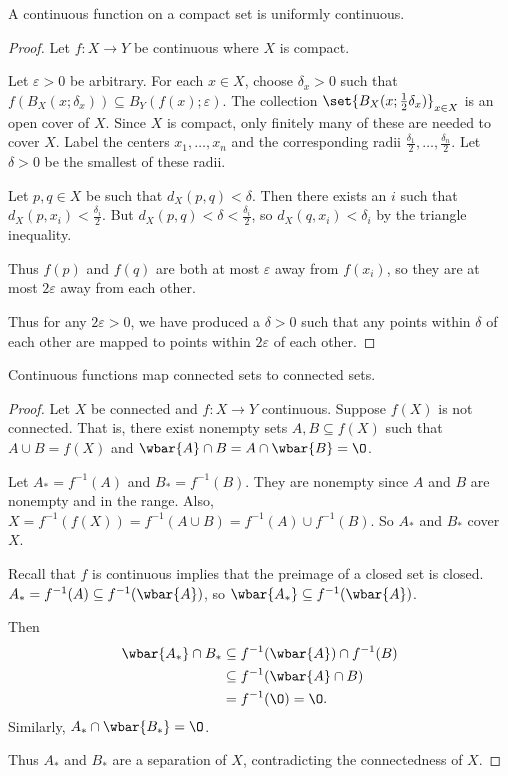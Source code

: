\begin{theorem} \label{thm:cont:compact_uniform}
    A continuous function on a compact set is uniformly continuous.
\end{theorem}
\begin{proof}
    Let $f\colon X \to Y$ be continuous where $X$ is compact.

    Let $\varepsilon > 0$ be arbitrary.
    For each $x \in X$, choose $\delta_x > 0$ such that
    $f(B_X(x; \delta_x)) \subseteq B_Y(f(x); \varepsilon)$.
    The collection $\set{B_X(x; \frac12 \delta_x)}_{x \in X}$ is an open
    cover of $X$.
    Since $X$ is compact, only finitely many of these are needed to cover
    $X$.
    Label the centers $x_1, \dots, x_n$ and the corresponding radii
    $\frac{\delta_1}{2}, \dots, \frac{\delta_n}{2}$.
    Let $\delta > 0$ be the smallest of these radii.

    Let $p, q \in X$ be such that $d_X(p, q) < \delta$.
    Then there exists an $i$ such that $d_X(p, x_i) < \frac{\delta_i}{2}$.
    But $d_X(p, q) < \delta < \frac{\delta_i}{2}$,
    so $d_X(q, x_i) < \delta_i$ by the triangle inequality.

    Thus $f(p)$ and $f(q)$ are both at most $\varepsilon$ away from
    $f(x_i)$, so they are at most $2\varepsilon$ away from each other.

    Thus for any $2\varepsilon > 0$, we have produced a $\delta > 0$ such
    that any points within $\delta$ of each other are mapped to points
    within $2\varepsilon$ of each other.
\end{proof}

\begin{theorem} \label{thm:cont:connected}
    Continuous functions map connected sets to connected sets.
\end{theorem}
\begin{proof}
    Let $X$ be connected and $f\colon X \to Y$ continuous.
    Suppose $f(X)$ is not connected.
    That is, there exist nonempty sets $A, B \subseteq f(X)$ such that
    $A \cup B = f(X)$ and $\wbar{A} \cap B = A \cap \wbar{B} = \O$.

    Let $A_* = f^{-1}(A)$ and $B_* = f^{-1}(B)$.
    They are nonempty since $A$ and $B$ are nonempty and in the range.
    Also,
    $X = f^{-1}(f(X)) = f^{-1}(A \cup B) = f^{-1}(A) \cup f^{-1}(B)$.
    So $A_*$ and $B_*$ cover $X$.

    Recall that $f$ is continuous implies that the preimage of a closed
    set is closed.
    $A_* = f^{-1}(A) \subseteq f^{-1}(\wbar{A})$, so
    $\wbar{A_*} \subseteq f^{-1}(\wbar{A})$.

    Then \begin{align*}
        \wbar{A_*} \cap B_* &\subseteq f^{-1}(\wbar{A}) \cap f^{-1}(B) \\
        &\subseteq f^{-1}(\wbar{A} \cap B) \\
        &= f^{-1}(\O) = \O.
    \end{align*}
    Similarly, $A_* \cap \wbar{B_*} = \O$.

    Thus $A_*$ and $B_*$ are a separation of $X$, contradicting the
    connectedness of $X$.
\end{proof}

